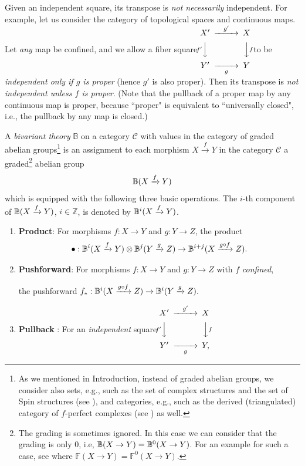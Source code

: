 \documentclass[a4paper]{amsart}
\begin{document}
\begin{rem}Given an independent square, 
its transpose is \emph{not necessarily} independent. For example, let us consider the category of topological spaces and continuous maps. Let \emph{any} map be confined, and we allow a fiber square
\quad $\CD
X' @> {g'} >> X \\
@V {f'}VV @VV {f}V\\
Y' @>> {g} > Y \endCD
$ \quad 
to be \emph{independent only if $g$ is proper} (hence $g'$ is also proper). Then its transpose is \emph{not independent unless 
$f$ is proper}. (Note that the pullback of a proper map by any continuous map is proper, because ``proper" is equivalent to ``universally closed", i.e., the pullback by any map is closed.)
\end{rem}
\begin{def}\label{BivariantTheory}
A \emph{bivariant theory} $\mathbb B$ on a category $\mathscr C$ with values in the category of graded abelian groups\footnote{As we mentioned in Introduction, instead of graded abelian groups, we consider also sets, e.g., such as the set of complex structures and the set of Spin structures (see \cite[\S 4.3.2]{FM}),  and categories, e.g., such as the derived (triangulated) category of $f$-perfect complexes (see \cite[\S 7.1 Grothendieck duality]{FM}) as well.}
 is an assignment to each morphism
$ X  \xrightarrow{f} Y$
in the category $\mathscr C$ a graded\footnote{The grading is sometimes ignored. In this case we can consider that the grading is only $0$, i.e, $\mathbb B(X \to Y) = \mathbb B^0(X \to Y)$. For an example for such a case, see \cite[\S 6.1.2 Definition of $\mathbb F$]{FM} where $\mathbb F(X \to Y) = \mathbb F^0(X \to Y)$.}
abelian group $$\mathbb B(X  \xrightarrow{f} Y)$$
which is equipped with the following three basic operations. The $i$-th component of $\mathbb B(X  \xrightarrow{f} Y)$, $i \in \mathbb Z$, is denoted by $\mathbb B^i(X  \xrightarrow{f} Y)$.
\begin{enumerate}
\item {\bf Product}: For morphisms $f: X \to Y$ and $g: Y
\to Z$, the product 
$$\bullet: \mathbb B^i( X  \xrightarrow{f}  Y) \otimes \mathbb B^j( Y  \xrightarrow{g}  Z) \to
\mathbb B^{i+j}( X  \xrightarrow{g\circ f}  Z).$$
\item {\bf Pushforward}: For morphisms $f: X \to Y$
and $g: Y \to Z$ with $f$ \emph {confined}, 

the pushforward 
$f_*: \mathbb B^i( X  \xrightarrow{g\circ f} Z) \to \mathbb B^i( Y  \xrightarrow{g}  Z).$
\item {\bf Pullback} : For an \emph{independent} square \qquad $\CD
X' @> g' >> X \\
@V f' VV @VV f V\\
Y' @>> g > Y, \endCD
$


\end{enumerate}
\end{def}
\end{document}
